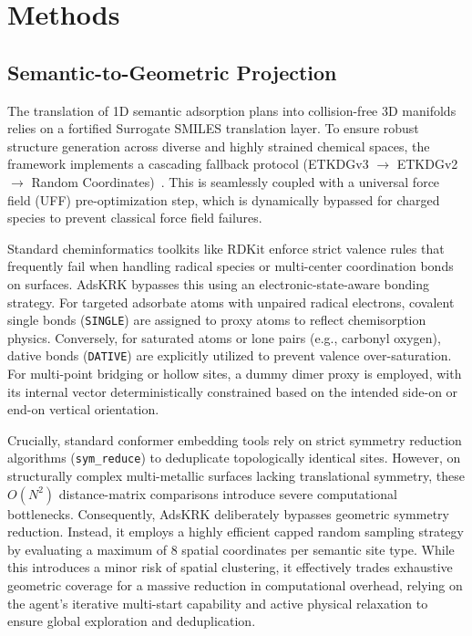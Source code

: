 \documentclass{article}
\begin{document}
\section{Methods}
\subsection{Semantic-to-Geometric Projection}
The translation of 1D semantic adsorption plans into collision-free 3D manifolds relies on a fortified Surrogate SMILES translation layer. To ensure robust structure generation across diverse and highly strained chemical spaces, the framework implements a cascading fallback protocol (ETKDGv3 $\rightarrow$ ETKDGv2 $\rightarrow$ Random Coordinates)~\cite{riniker2015better}. This is seamlessly coupled with a universal force field (UFF) pre-optimization step, which is dynamically bypassed for charged species to prevent classical force field failures.

Standard cheminformatics toolkits like RDKit enforce strict valence rules that frequently fail when handling radical species or multi-center coordination bonds on surfaces. AdsKRK bypasses this using an electronic-state-aware bonding strategy. For targeted adsorbate atoms with unpaired radical electrons, covalent single bonds (\texttt{SINGLE}) are assigned to proxy atoms to reflect chemisorption physics. Conversely, for saturated atoms or lone pairs (e.g., carbonyl oxygen), dative bonds (\texttt{DATIVE}) are explicitly utilized to prevent valence over-saturation. For multi-point bridging or hollow sites, a dummy dimer proxy is employed, with its internal vector deterministically constrained based on the intended side-on or end-on vertical orientation.

Crucially, standard conformer embedding tools rely on strict symmetry reduction algorithms (\texttt{sym\_reduce}) to deduplicate topologically identical sites. However, on structurally complex multi-metallic surfaces lacking translational symmetry, these $O(N^2)$ distance-matrix comparisons introduce severe computational bottlenecks. Consequently, AdsKRK deliberately bypasses geometric symmetry reduction. Instead, it employs a highly efficient capped random sampling strategy by evaluating a maximum of 8 spatial coordinates per semantic site type. While this introduces a minor risk of spatial clustering, it effectively trades exhaustive geometric coverage for a massive reduction in computational overhead, relying on the agent's iterative multi-start capability and active physical relaxation to ensure global exploration and deduplication. 
\end{document}
